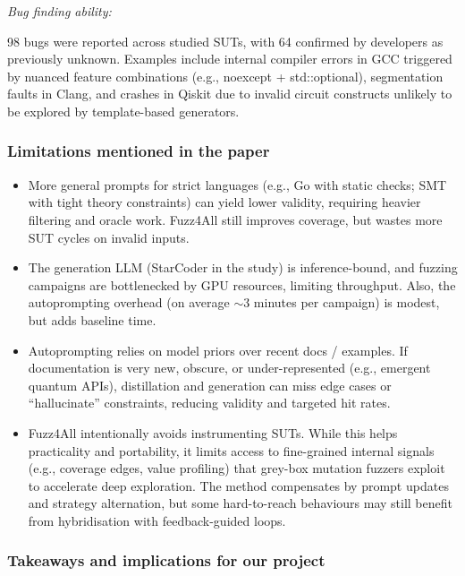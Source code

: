 \lilspace
\textit{Bug finding ability:}

98 bugs were reported across studied SUTs, with 64 confirmed by developers as previously unknown. Examples include internal compiler errors in GCC triggered by nuanced feature combinations (e.g., noexcept + std::optional), segmentation faults in Clang, and crashes in Qiskit due to invalid circuit constructs unlikely to be explored by template-based generators.

\subsubsection{Limitations mentioned in the paper}

\begin{itemize}
    \item More general prompts for strict languages (e.g., Go with static checks; SMT with tight theory constraints) can yield lower validity, requiring heavier filtering and oracle work. Fuzz4All still improves coverage, but wastes more SUT cycles on invalid inputs.

    \item The generation LLM (StarCoder in the study) is inference-bound, and fuzzing campaigns are bottlenecked by GPU resources, limiting throughput. Also, the autoprompting overhead (on average $\sim$3 minutes per campaign) is modest, but adds baseline time.

    \item Autoprompting relies on model priors over recent docs / examples. If documentation is very new, obscure, or under-represented (e.g., emergent quantum APIs), distillation and generation can miss edge cases or ``hallucinate'' constraints, reducing validity and targeted hit rates.

    \item Fuzz4All intentionally avoids instrumenting SUTs. While this helps practicality and portability, it limits access to fine-grained internal signals (e.g., coverage edges, value profiling) that grey-box mutation fuzzers exploit to accelerate deep exploration. The method compensates by prompt updates and strategy alternation, but some hard-to-reach behaviours may still benefit from hybridisation with feedback-guided loops.

\end{itemize}

\subsubsection{Takeaways and implications for our project}

